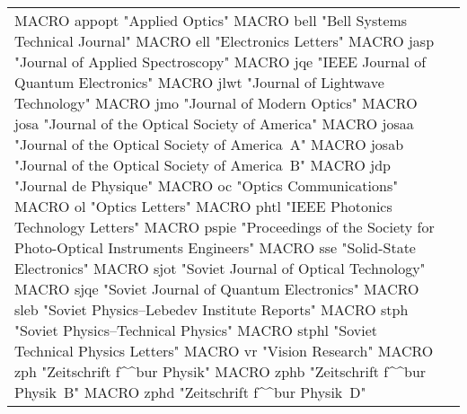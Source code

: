 \documentclass{article}
\begin{document}
\begin{longtable}{lp{6cm}}
MACRO {appopt} {"Applied Optics"}
MACRO {bell} {"Bell Systems Technical Journal"}
MACRO {ell} {"Electronics Letters"}
MACRO {jasp} {"Journal of Applied Spectroscopy"}
MACRO {jqe} {"IEEE Journal of Quantum Electronics"}
MACRO {jlwt} {"Journal of Lightwave Technology"}
MACRO {jmo} {"Journal of Modern Optics"}
MACRO {josa} {"Journal of the Optical Society of America"}
MACRO {josaa} {"Journal of the Optical Society of America~A"}
MACRO {josab} {"Journal of the Optical Society of America~B"}
MACRO {jdp} {"Journal de Physique"}
MACRO {oc} {"Optics Communications"}
MACRO {ol} {"Optics Letters"}
MACRO {phtl} {"IEEE Photonics Technology Letters"}
MACRO {pspie} {"Proceedings of the Society for Photo-Optical Instruments Engineers"}
MACRO {sse} {"Solid-State Electronics"}
MACRO {sjot} {"Soviet Journal of Optical Technology"}
MACRO {sjqe} {"Soviet Journal of Quantum Electronics"}
MACRO {sleb} {"Soviet Physics--Lebedev Institute Reports"}
MACRO {stph} {"Soviet Physics--Technical Physics"}
MACRO {stphl} {"Soviet Technical Physics Letters"}
MACRO {vr} {"Vision Research"}
MACRO {zph} {"Zeitschrift f\^^b{u}r Physik"}
MACRO {zphb} {"Zeitschrift f\^^b{u}r Physik~B"}
MACRO {zphd} {"Zeitschrift f\^^b{u}r Physik~D"}


\end{longtable}
\end{document}
